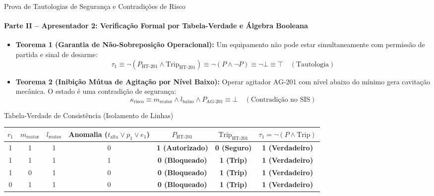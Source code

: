 \documentclass[aspectratio=169, 10pt]{beamer}
\begin{document}
\begin{frame}{Prova de Tautologias de Segurança e Contradições de Risco}
  \framesubtitle{Parte II -- Apresentador 2: Verificação Formal por Tabela-Verdade e Álgebra Booleana}
  \begin{itemize}
    \item \textbf{Teorema 1 (Garantia de Não-Sobreposição Operacional):}
    Um equipamento não pode estar simultaneamente com permissão de partida e sinal de desarme:
    $$\tau_1 \equiv \neg (P_{\text{HT-201}} \land \text{Trip}_{\text{HT-201}}) \equiv \neg (P \land \neg P) \equiv \neg \bot \equiv \top \quad (\text{Tautologia})$$
    
    \item \textbf{Teorema 2 (Inibição Mútua de Agitação por Nível Baixo):}
    Operar agitador AG-201 com nível abaixo do mínimo gera cavitação mecânica. O estado é uma contradição de segurança:
    $$\kappa_{\text{risco}} \equiv m_{\text{reator}} \land l_{\text{baixo}} \land P_{\text{AG-201}} \equiv \bot \quad (\text{Contradição no SIS})$$
  \end{itemize}

  \begin{exampleblock}{Tabela-Verdade de Consistência (Isolamento de Linhas)}
    \centering
    \tiny
    \begin{tabular}{cccc|cc|c}
      \toprule
      $r_1$ & $m_{\text{reator}}$ & $l_{\text{reator}}$ & Anomalia ($t_{\text{alta}} \lor p_1 \lor e_1$) & $P_{\text{HT-201}}$ & $\text{Trip}_{\text{HT-201}}$ & $\tau_1 = \neg (P \land \text{Trip})$ \\
      \midrule
      1 & 1 & 1 & 0 & \textbf{1 (Autorizado)} & \textbf{0 (Seguro)} & \textbf{1 (Verdadeiro)} \\
      1 & 1 & 1 & 1 & \textbf{0 (Bloqueado)} & \textbf{1 (Trip)} & \textbf{1 (Verdadeiro)} \\
      1 & 0 & 1 & 0 & \textbf{0 (Bloqueado)} & \textbf{1 (Trip)} & \textbf{1 (Verdadeiro)} \\
      0 & 1 & 1 & 0 & \textbf{0 (Bloqueado)} & \textbf{1 (Trip)} & \textbf{1 (Verdadeiro)} \\
      \bottomrule
    \end{tabular}
  \end{exampleblock}
\end{frame}
\end{document}
